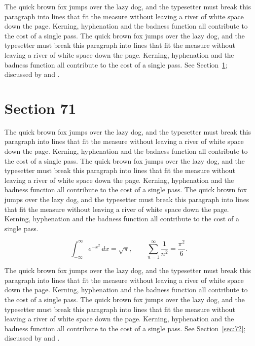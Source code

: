 \documentclass{article}
\begin{document}
The quick brown fox jumps over the lazy dog, and the typesetter must break this paragraph into lines that fit the measure without leaving a river of white space down the page. Kerning, hyphenation and the badness function all contribute to the cost of a single pass. The quick brown fox jumps over the lazy dog, and the typesetter must break this paragraph into lines that fit the measure without leaving a river of white space down the page. Kerning, hyphenation and the badness function all contribute to the cost of a single pass. 
See Section~\ref{sec:71}; discussed by \textcite{k1} and \textcite{l3}.
\section{Section 71}
\label{sec:71}
The quick brown fox jumps over the lazy dog, and the typesetter must break this paragraph into lines that fit the measure without leaving a river of white space down the page. Kerning, hyphenation and the badness function all contribute to the cost of a single pass. The quick brown fox jumps over the lazy dog, and the typesetter must break this paragraph into lines that fit the measure without leaving a river of white space down the page. Kerning, hyphenation and the badness function all contribute to the cost of a single pass. The quick brown fox jumps over the lazy dog, and the typesetter must break this paragraph into lines that fit the measure without leaving a river of white space down the page. Kerning, hyphenation and the badness function all contribute to the cost of a single pass. 

\begin{equation}\label{eq:71}
\int_{-\infty}^{\infty} e^{-x^{2}}\,dx = \sqrt{\pi}, \qquad
\sum_{n=1}^{\infty} \frac{1}{n^{2}} = \frac{\pi^{2}}{6}.
\end{equation}

The quick brown fox jumps over the lazy dog, and the typesetter must break this paragraph into lines that fit the measure without leaving a river of white space down the page. Kerning, hyphenation and the badness function all contribute to the cost of a single pass. The quick brown fox jumps over the lazy dog, and the typesetter must break this paragraph into lines that fit the measure without leaving a river of white space down the page. Kerning, hyphenation and the badness function all contribute to the cost of a single pass. 
See Section~\ref{sec:72}; discussed by \textcite{k2} and \textcite{l4}.
\end{document}
